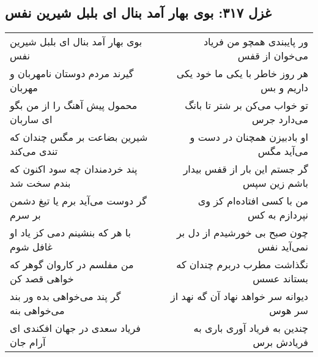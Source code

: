 \begin{center}
\section*{غزل ۳۱۷: بوی بهار آمد بنال ای بلبل شیرین نفس}
\label{sec:317}
\begin{longtable}{l p{0.5cm} r}
بوی بهار آمد بنال ای بلبل شیرین نفس
&&
ور پایبندی همچو من فریاد می‌خوان از قفس
\\
گیرند مردم دوستان نامهربان و مهربان
&&
هر روز خاطر با یکی ما خود یکی داریم و بس
\\
محمول پیش آهنگ را از من بگو ای ساربان
&&
تو خواب می‌کن بر شتر تا بانگ می‌دارد جرس
\\
شیرین بضاعت بر مگس چندان که تندی می‌کند
&&
او بادبیزن همچنان در دست و می‌آید مگس
\\
پند خردمندان چه سود اکنون که بندم سخت شد
&&
گر جستم این بار از قفس بیدار باشم زین سپس
\\
گر دوست می‌آید برم یا تیغ دشمن بر سرم
&&
من با کسی افتاده‌ام کز وی نپردازم به کس
\\
با هر که بنشینم دمی کز یاد او غافل شوم
&&
چون صبح بی خورشیدم از دل بر نمی‌آید نفس
\\
من مفلسم در کاروان گوهر که خواهی قصد کن
&&
نگذاشت مطرب دربرم چندان که بستاند عسس
\\
گر پند می‌خواهی بده ور بند می‌خواهی بنه
&&
دیوانه سر خواهد نهاد آن گه نهد از سر هوس
\\
فریاد سعدی در جهان افکندی ای آرام جان
&&
چندین به فریاد آوری باری به فریادش برس
\\
\end{longtable}
\end{center}
